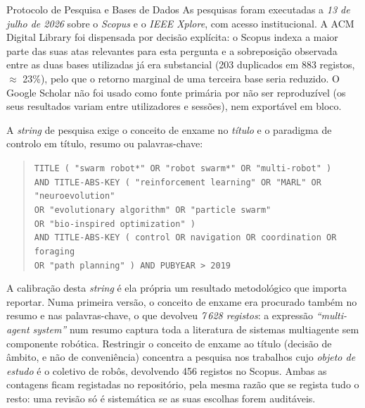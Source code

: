 \documentclass[12pt,reqno, twoside]{amsbook}
\makeatletter
\def\subsection{\@startsection{subsection}{2}%
      \z@{.5\linespacing\@plus.7\linespacing}{.25\linespacing}%
      {\normalfont\bfseries\flushleft}}
\theoremstyle{plain}
\numberwithin{equation}{chapter}
\numberwithin{section}{chapter}
\numberwithin{table}{chapter}
\numberwithin{figure}{chapter}
\makeatother
\begin{document}
\subsection{Protocolo de Pesquisa e Bases de Dados}
As pesquisas foram executadas a \emph{13 de julho de 2026} sobre o \emph{Scopus} e o \emph{IEEE Xplore}, com acesso institucional. A ACM Digital Library foi dispensada por decisão explícita: o Scopus indexa a maior parte das suas atas relevantes para esta pergunta e a sobreposição observada entre as duas bases utilizadas já era substancial (203 duplicados em 883 registos, $\approx$ 23\%), pelo que o retorno marginal de uma terceira base seria reduzido. O Google Scholar não foi usado como fonte primária por não ser reproduzível (os seus resultados variam entre utilizadores e sessões), nem exportável em bloco.

A \textit{string} de pesquisa exige o conceito de enxame no \emph{título} e o paradigma de controlo em título, resumo ou palavras-chave:

\begin{quote}\scriptsize
\texttt{TITLE ( "swarm robot*" OR "robot swarm*" OR "multi-robot" )}\\
\texttt{AND TITLE-ABS-KEY ( "reinforcement learning" OR "MARL" OR "neuroevolution"}\\
\texttt{\phantom{AND TITLE-ABS-KEY ( }OR "evolutionary algorithm" OR "particle swarm"}\\
\texttt{\phantom{AND TITLE-ABS-KEY ( }OR "bio-inspired optimization" )}\\
\texttt{AND TITLE-ABS-KEY ( control OR navigation OR coordination OR foraging}\\
\texttt{\phantom{AND TITLE-ABS-KEY ( }OR "path planning" ) AND PUBYEAR > 2019}
\end{quote}

A calibração desta \textit{string} é ela própria um resultado metodológico que importa reportar. Numa primeira versão, o conceito de enxame era procurado também no resumo e nas palavras-chave, o que devolveu \emph{7\,628 registos}: a expressão \textit{``multi-agent system''} num resumo captura toda a literatura de sistemas multiagente sem componente robótica. Restringir o conceito de enxame ao título (decisão de âmbito, e não de conveniência) concentra a pesquisa nos trabalhos cujo \emph{objeto de estudo} é o coletivo de robôs, devolvendo 456 registos no Scopus. Ambas as contagens ficam registadas no repositório, pela mesma razão que se regista tudo o resto: uma revisão só é sistemática se as suas escolhas forem auditáveis.
\end{document}
